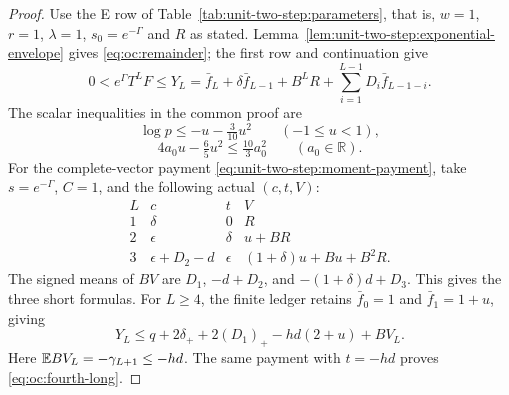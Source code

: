 \begin{proof}
Use the E row of Table~\ref{tab:unit-two-step:parameters}, that is,
$w=1$, $r=1$, $\lambda=1$, $s_0=e^{-\Gamma}$ and $R$ as stated.
Lemma~\ref{lem:unit-two-step:exponential-envelope} gives
\eqref{eq:oc:remainder}; the first row and continuation give
\begin{equation}\tag{R29.5.3}\label{eq:oc:fourth-duhamel}
 0<e^\Gamma T^LF\le Y_L
 =\bar f_L+\delta\bar f_{L-1}+B^LR
       +\sum_{i=1}^{L-1}D_i\bar f_{L-1-i}.
\end{equation}
The scalar inequalities in the common proof are
\begin{equation}\tag{R29.5.4}\label{eq:oc:unit-log}
 \log p\le-u-\tfrac3{10}u^2\qquad(-1\le u<1),
\end{equation}
\begin{equation}\tag{R29.5.5}\label{eq:oc:unit-square}
 4a_0u-\tfrac65u^2\le\tfrac{10}{3}a_0^2
 \qquad(a_0\in\mathbb R).
\end{equation}
For the complete-vector payment
\eqref{eq:unit-two-step:moment-payment}, take $s=e^{-\Gamma}$,
$C=1$, and the following actual $(c,t,V)$:
\[
\begin{array}{c|ccc}
 L&c&t&V\\\hline
 1&\delta&0&R\\
 2&\epsilon&\delta&u+BR\\
 3&\epsilon+D_2-d&\epsilon&(1+\delta)u+Bu+B^2R.
\end{array}
\]
The signed means of $BV$ are $D_1$, $-d+D_2$, and
$-(1+\delta)d+D_3$. This gives the three short formulas.
For $L\ge4$, the finite ledger retains $\bar f_0=1$ and
$\bar f_1=1+u$, giving
\[
 Y_L\le q+2\delta_++2(D_1)_+-hd(2+u)+BV_L.
\]
Here $\mathbb E BV_L=-\gamma_{L+1}\le-hd$.
The same payment with $t=-hd$ proves
\eqref{eq:oc:fourth-long}.
\end{proof}

